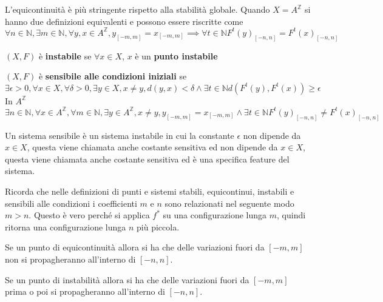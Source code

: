 \begin{nota}
    L'equicontinuità è più stringente rispetto alla stabilità globale. Quando $X=A^\mathbb{Z}$
    si hanno due definizioni equivalenti e possono essere riscritte come
    $$\forall n\in \mathbb{N} ,\exists m\in \mathbb{N} , \forall y,x\in A^\mathbb{Z}, y_{[-m,m]} = x_{[-m,m]} \implies \forall t\in \mathbb{N} F^t(y)_{[-n,n]}=F^t(x)_{[-n,n]}$$
\end{nota}


\begin{definizione} 
    $(X,F)$ è \textbf{instabile} se $\forall x \in X$, $x$ è un \textbf{punto instabile}
\end{definizione}

\begin{definizione} 
    $(X,F)$ è \textbf{sensibile alle condizioni iniziali} se
    $$\exists \epsilon > 0,\forall x \in X, \forall \delta > 0, \exists y\in X,x \ne y, d(y,x) < \delta \land \exists t\in \mathbb{N} d(F^t(y),F^t(x))\ge \epsilon$$
    In $A^\mathbb{Z}$
    $$\exists n\in \mathbb{N} ,\forall x \in A^\mathbb{Z}, \forall m\in \mathbb{N} , \exists y\in A^\mathbb{Z},x \ne y, y_{[-m,m]} = x_{[-m,m]} \land \exists t\in \mathbb{N} F^t(y)_{[-n,n]}\ne F^t(x)_{[-n,n]}$$
\end{definizione}


\begin{nota}
    Un sistema sensibile è un sistema instabile in cui la constante $\epsilon$
    non dipende da $x\in X$, questa viene chiamata anche costante sensitiva ed
    non dipende da $x\in X$, questa viene chiamata anche costante sensitiva ed
    è una specifica feature del sistema.
\end{nota}


\begin{nota}
    Ricorda che nelle definizioni di punti e sistemi stabili, equicontinui, instabili e sensibili
    alle condizioni i coefficienti $m$ e $n$ sono relazionati nel seguente modo $m> n$.
    Questo è vero perché si applica $f^\ast$ su una configurazione lunga $m$, quindi
    ritorna una configurazione lunga $n$ più piccola.
\end{nota}

Se un punto di equicontinuità allora si ha che delle variazioni fuori da $[-m,m]$
non si propagheranno all'interno di $[-n,n]$.

Se un punto di instabilità allora si ha che delle variazioni fuori da $[-m,m]$
prima o poi si propagheranno all'interno di $[-n,n]$.

